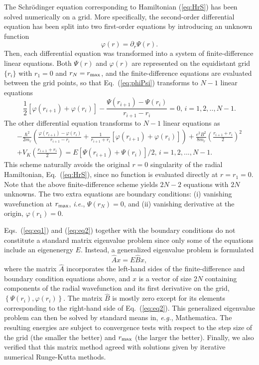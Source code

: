 \documentclass[aps,prl,twocolumn]{revtex4-1}
\begin{document}
The Schr\"{o}dinger equation corresponding to Hamiltonian (\ref{eq:HrS})
has been solved numerically on a grid. More specifically, the second-order
differential equation has been split into two first-order equations
by introducing an unknown function
\begin{equation}
\varphi(r)=\partial_{r}\Psi(r).\label{eq:phiPsi}
\end{equation}
 Then, each differential equation was transformed into a system of
finite-difference linear equations. Both $\Psi(r)$ and $\varphi(r)$
are represented on the equidistant grid $\{r_{i}\}$ with $r_{1}=0$
and $r_{N}=r_{\rm max}$, and the finite-difference equations are 
evaluated between the grid points, so that Eq.~(\ref{eq:phiPsi})
transforms to $N-1$ linear equations
\begin{equation}
\frac{1}{2}\left[\varphi(r_{i+1})+\varphi(r_{i})\right]-\frac{\Psi(r_{i+1})-\Psi(r_{i})}{r_{i+1}-r_{i}}=0,\,i=1,2,..,N-1. \label{eq:eq1}
\end{equation}
The other differential equation transforms to $N-1$ linear equations
as
%
\begin{gather}
-\frac{\hbar^{2}}{2m_r}\left(\frac{\varphi(r_{i+1})-\varphi(r_{i})}{r_{i+1}-r_{i}}+\frac{1}{r_{i+1}+r_{i}}\left[\varphi(r_{i+1})+\varphi(r_{i})\right]\right)+\frac{e^{2}B^{2}}{8m_r}\left(\frac{r_{i+1}+r_{i}}{2}\right)^{2}\nonumber \\
+V_K\left(\frac{r_{i+1}+r_{i}}{2}\right)=E\left[\Psi(r_{i+1})+\Psi(r_{i})\right]/2,\,i=1,2,...,N-1. \label{eq:eq2}
\end{gather}
%
This scheme naturally avoids the original $r=0$ singularity
of the radial Hamiltonian, Eq.~(\ref{eq:HrS}), since no function is evaluated directly at $r = r_1 = 0$. Note that the above
finite-difference scheme yields $2N-2$ equations with $2N$ unknowns.
The two extra equations are boundary conditions: (i) vanishing wavefunction
at $r_{\rm max}$, \textit{i.e.}, $\Psi(r_{N})=0$, and (ii) vanishing derivative
at the origin, $\varphi(r_{1})=0$.

Eqs.~(\ref{eq:eq1}) and (\ref{eq:eq2}) together with the boundary conditions do not constitute a standard matrix eigenvalue problem since only some of the equations include an eigenenergy $E$. Instead, a generalized eigenvalue problem is formulated
\begin{equation}
\hat{A}x=E\hat{B}x,
\end{equation}
where the matrix $\hat{A}$ incorporates the left-hand sides of the finite-difference and boundary condition equations above, and $x$ is a vector of size $2N$ containing components of the radial wavefunction and its first derivative on the grid, $\left\{ \Psi(r_{i}),\varphi(r_{i})\right\} $. The matrix $\hat{B}$ is mostly zero except for its elements corresponding to the right-hand side of Eq.~(\ref{eq:eq2}). This generalized eigenvalue problem can then be solved by standard means in, \textit{e.g.}, Mathematica. The resulting energies are subject to convergence tests with respect to the step size of the grid (the smaller the better) and $r_{\rm max}$ (the larger the better).  Finally, we also verified that this matrix method agreed with solutions given by iterative numerical Runge-Kutta methods.
\end{document}
